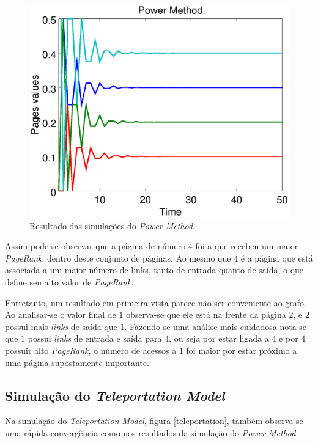 \documentclass[a4paper]{report} %
\begin{document}
\
\begin{figure}[!htb]
	\centering
	\includegraphics[scale=0.3]{imagens/powermethod}
	\caption{Resultado das simulações do \textit{Power Method}.}
	\label{powermethod}
\end{figure}

Assim pode-se observar que a página de número $4$ foi a que recebeu um maior \textit{PageRank}, dentro deste conjunto de páginas. Ao mesmo que $4$ é a página que está associada a um maior número de links, tanto de entrada quanto de saída, o que define seu alto valor de \textit{PageRank}.

Entretanto, um resultado em primeira vista parece não ser conveniente ao grafo. Ao analisar-se o valor final de $1$ observa-se que ele está na frente da página $2$, e $2$ possui mais \textit{links} de saída que $1$. Fazendo-se uma análise mais cuidadosa nota-se que $1$ possui \textit{links} de entrada e saída para $4$, ou seja por estar ligada a $4$ e por $4$ possuir alto \textit{PageRank}, o número de acessos a $1$ foi maior por estar próximo a uma página supostamente importante.  

\subsection*{Simulação do \textit{Teleportation Model}}

Na simulação do \textit{Teleportation Model}, figura \ref{teleportation}, também observa-se uma rápida convergência como nos resultados da simulação do \textit{Power Method}.
\end{document}
